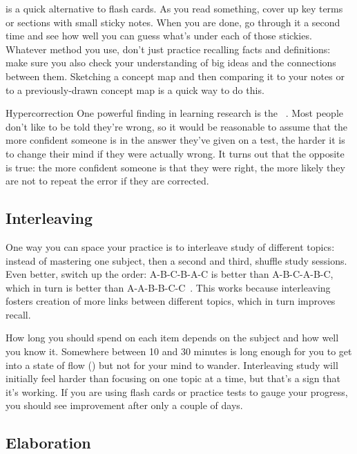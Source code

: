  is a quick alternative to flash cards.
As you read something,
cover up key terms or sections with small sticky notes.
When you are done,
go through it a second time and see how well you can guess what's under each of those stickies.
Whatever method you use,
don't just practice recalling facts and definitions:
make sure you also check your understanding of big ideas
and the connections between them.
Sketching a concept map and then comparing it to your notes
or to a previously-drawn concept map
is a quick way to do this.

\begin{aside}{Hypercorrection}
  One powerful finding in learning research is
  the ~\cite{Metc2016}.
  Most people don't like to be told they're wrong,
  so it would be reasonable to assume that
  the more confident someone is in the answer they've given on a test,
  the harder it is to change their mind if they were actually wrong.
  It turns out that the opposite is true:
  the more confident someone is that they were right,
  the more likely they are not to repeat the error if they are corrected.
\end{aside}

\subsection*{Interleaving}

One way you can space your practice is to interleave study of different topics:
instead of mastering one subject,
then a second and third,
shuffle study sessions.
Even better,
switch up the order:
A-B-C-B-A-C is better than A-B-C-A-B-C,
which in turn is better than A-A-B-B-C-C~\cite{Rohr2015}.
This works because interleaving fosters creation of more links between different topics,
which in turn improves recall.

How long you should spend on each item
depends on the subject and how well you know it.
Somewhere between 10 and 30 minutes is long enough for you to get into
a state of flow ()
but not for your mind to wander.
Interleaving study will initially feel harder than focusing on one topic at a time,
but that's a sign that it's working.
If you are using flash cards or practice tests to gauge your progress,
you should see improvement after only a couple of days.

\subsection*{Elaboration}

